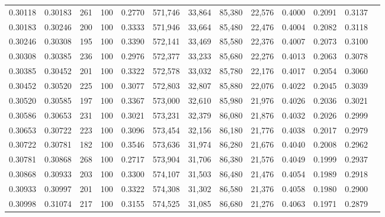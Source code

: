 \begin{tabular}{rrrrrrrrrrrrr}
0.30118 & 0.30183 &   261 & 100 &                                     0.2770 & 571,746 &  33,864 &  85,380 &  22,576 & 0.4000 & 0.2091 & 0.3137 \\
0.30183 & 0.30246 &   200 & 100 &                                     0.3333 & 571,946 &  33,664 &  85,480 &  22,476 & 0.4004 & 0.2082 & 0.3118 \\
0.30246 & 0.30308 &   195 & 100 &                                     0.3390 & 572,141 &  33,469 &  85,580 &  22,376 & 0.4007 & 0.2073 & 0.3100 \\
0.30308 & 0.30385 &   236 & 100 &                                     0.2976 & 572,377 &  33,233 &  85,680 &  22,276 & 0.4013 & 0.2063 & 0.3078 \\
0.30385 & 0.30452 &   201 & 100 &                                     0.3322 & 572,578 &  33,032 &  85,780 &  22,176 & 0.4017 & 0.2054 & 0.3060 \\
0.30452 & 0.30520 &   225 & 100 &                                     0.3077 & 572,803 &  32,807 &  85,880 &  22,076 & 0.4022 & 0.2045 & 0.3039 \\
0.30520 & 0.30585 &   197 & 100 &                                     0.3367 & 573,000 &  32,610 &  85,980 &  21,976 & 0.4026 & 0.2036 & 0.3021 \\
0.30586 & 0.30653 &   231 & 100 &                                     0.3021 & 573,231 &  32,379 &  86,080 &  21,876 & 0.4032 & 0.2026 & 0.2999 \\
0.30653 & 0.30722 &   223 & 100 &                                     0.3096 & 573,454 &  32,156 &  86,180 &  21,776 & 0.4038 & 0.2017 & 0.2979 \\
0.30722 & 0.30781 &   182 & 100 &                                     0.3546 & 573,636 &  31,974 &  86,280 &  21,676 & 0.4040 & 0.2008 & 0.2962 \\
0.30781 & 0.30868 &   268 & 100 &                                     0.2717 & 573,904 &  31,706 &  86,380 &  21,576 & 0.4049 & 0.1999 & 0.2937 \\
0.30868 & 0.30933 &   203 & 100 &                                     0.3300 & 574,107 &  31,503 &  86,480 &  21,476 & 0.4054 & 0.1989 & 0.2918 \\
0.30933 & 0.30997 &   201 & 100 &                                     0.3322 & 574,308 &  31,302 &  86,580 &  21,376 & 0.4058 & 0.1980 & 0.2900 \\
0.30998 & 0.31074 &   217 & 100 &                                     0.3155 & 574,525 &  31,085 &  86,680 &  21,276 & 0.4063 & 0.1971 & 0.2879 \\

\end{tabular}

